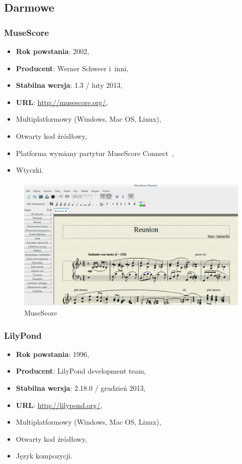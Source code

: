 \documentclass[polish,thesis,12pt]{dcsbook}
\begin{document}
\subsection{Darmowe}
\subsubsection{MuseScore}
\begin{itemize}
  \item \textbf{Rok powstania}: 2002,
  \item \textbf{Producent}: Werner Schweer i~inni,
  \item \textbf{Stabilna wersja}: 1.3 / luty 2013,
  \item \textbf{URL}: \url{http://musescore.org/},
  \item Multiplatformowy (Windows, Mac OS, Linux),
  \item Otwarty kod źródłowy,
  \item Platforma wymiany partytur MuseScore Connect~\cite{MuseScore.com},
  \item Wtyczki.
\end{itemize}

\begin{figure}[H]
  \centering
  \includegraphics[scale=0.35,bb=0 0 1262 729]{img/musescore.png}
  \caption{MuseScore}
  \label{musescore}
\end{figure}

\subsubsection{LilyPond}
\begin{itemize}
  \item \textbf{Rok powstania}: 1996,
  \item \textbf{Producent}: LilyPond development team,
  \item \textbf{Stabilna wersja}: 2.18.0 / grudzień 2013,
  \item \textbf{URL}: \url{http://lilypond.org/},
  \item Multiplatformowy (Windows, Mac OS, Linux),
  \item Otwarty kod źródłowy,
  \item Język kompozycji.
\end{itemize}
\end{document}
